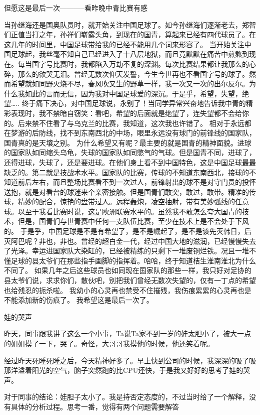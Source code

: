 但愿这是最后一次———–看昨晚中青比赛有感

  当孙继海还是国奥队员时，就开始关注中国足球了。如今孙继海们逐渐老去，郑智们正值当打之年，孙祥们崭露头角，到现在的国青，算起来已经有四代球员了。在这几年的时间里，中国足球带给我的已经不能用几个词来形容了。
  当开始关注中国足球起，我丝毫不知自己已经进入了十八层地狱，而且竟默默在痛苦中煎熬到现在。每当国字号比赛时，我都陷入万劫不复的深渊。每次比赛结果都让我那么的心碎，那么的欲哭无泪。曾经无数次仰天发誓，今生今世再也不看国字号的球了。然而希望就如同野火烧不尽，春风吹又生的野草一样，我一次又一次的出尔反尔。为什么我如此的言而无信，因为我对中国足球爱的深沉。于是乎，希望，失望，绝望…..
  终于痛下决心，对中国足球说，永别了！当同学异常兴奋地告诉我中青的精彩表现时，我不禁暗自窃笑：看吧，希望的后面就是绝望了，连失望都不会给你的。后来禁不住看了与乌克兰的比赛，我知道，这次我也许错了。
  相对于永远都在梦游的后防线，找不到东南西北的中场，眼里永远没有球门的前锋线的国家队，国青真的是天壤之别。
  为什么希望又有呢？最主要的就是国青的精神面貌。进球的国家队如同缩头乌龟，失球的国家队如同憋气的气球。但是国青不同，进球了，还得进球，失球了，还是要进球。在他们身上看不到中国特色，这是中国足球最最缺乏的。第二就是技战术水平。国家队的比赛，传球的不知道东南西北，接球的不知道前后左右，而且整场比赛看不到一次过人，前锋射出的球不是对守门员的投怀送抱，就是对看台的球迷来个亲密接触。但是国青们敢突，敢过，敢带。精准的传球，精妙的配合，惊艳的盘带过人。远程轰炮，凌空抽射，带有美妙弧线的任意球。以至于我看比赛时说，这是欧洲联赛水平的。虽然我不敢怎么夸大国青的技术，但是，国青们与世青赛中任何一支队伍比赛，至少在技术上是不会处于下风的。
  于是乎，中国足球是不是有希望了，是不是崛起了，是不是该先灭韩日，后灭阿巴呢？非也，非也。曾经的超白金一代，经过中国大地的滋润，已经慢慢失去了光泽。幸运进国家队大染缸的，已经被精练的只剩下一堆废铜烂铁。况且一堆不懂足球的县太爷们在那些指手画脚的指挥着。哈哈，终于知道桔生淮南淮北为什么不同了。
  如果几年之后这些球员也如同现在国家队的那些一样，我只好对足协的县太爷们说，求求你们，散伙吧，别把我们曾经无数次失望的，仅有一丁点的希望也给残忍的扼杀啦。
  我幼小的心灵再也禁受不住摧残，我伤痕累累的心灵再也是不能添加新的伤痕了。
  我希望这是最后一次了。


娃的哭声

昨天，同事跟我讲了这么一个小事，Ta说Ta家不到一岁的娃太胆小了，被大一点的姐姐摸了一下，哭了。奇怪，大哥哥我摸他的时候，他还笑着呢。

经过昨天死睡死睡之后，今天精神好多了。早上快到公司的时候，我深深的吸了吸那洋溢着阳光的空气，脑子突然跑的比CPU还快，于是我又好好的思考了娃的哭声。

对于同事的结论：娃胆子太小了。我是持否定态度的，不过当时给了一个解释，没有具体的分析过程。思考一番，觉得有两个问题需要解答

